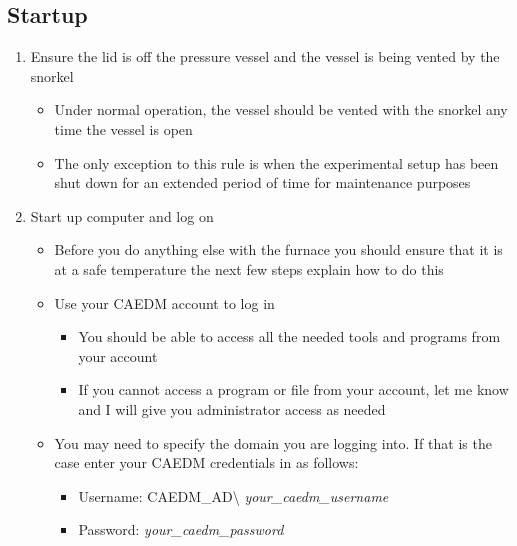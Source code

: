 \documentclass[letterpaper,11pt]{article}
\begin{document}
    \subsection{Startup}
    \begin{enumerate}
    \item Ensure the lid is off the pressure vessel and the vessel is being 
        vented by the snorkel
        \begin{itemize}
        \item Under normal operation, the vessel should be vented with the 
            snorkel any time the vessel is open
        \item The only exception to this rule is when the experimental setup has
            been shut down for an extended period of time for maintenance 
            purposes
        \end{itemize}
    \item Start up computer and log on
        \begin{itemize}
        \item Before you do anything else with the furnace you should ensure 
            that it is at a safe temperature the next few steps explain how 
            to do this
        \item Use your CAEDM account to log in
            \begin{itemize}
            \item You should be able to access all the needed tools and 
                programs from your account
            \item If you cannot access a program or file from your account, let 
                me know and I will give you administrator access as needed
            \end{itemize}
        
        \item You may need to specify the domain you are logging into. If that 
            is the case enter your CAEDM credentials in as follows:
            \begin{itemize}
            \item Username: CAEDM\_AD\textbackslash
            \textit{your\_caedm\_username}
            \item Password: \textit{your\_caedm\_password}
            \end{itemize}
        
        

\end{itemize}
\end{enumerate}
\end{document}

